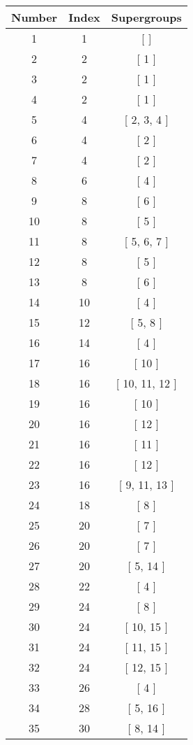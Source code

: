 \begin{center}
\begin{longtable}[H]{|| c c c ||}
\hline
Number & Index & Supergroups \\ 
\hline
1 & 1 & [ ] \\ 
\hline
2 & 2 & [ 1 ] \\ 
\hline
3 & 2 & [ 1 ] \\ 
\hline
4 & 2 & [ 1 ] \\ 
\hline
5 & 4 & [ 2, 3, 4 ] \\ 
\hline
6 & 4 & [ 2 ] \\ 
\hline
7 & 4 & [ 2 ] \\ 
\hline
8 & 6 & [ 4 ] \\ 
\hline
9 & 8 & [ 6 ] \\ 
\hline
10 & 8 & [ 5 ] \\ 
\hline
11 & 8 & [ 5, 6, 7 ] \\ 
\hline
12 & 8 & [ 5 ] \\ 
\hline
13 & 8 & [ 6 ] \\ 
\hline
14 & 10 & [ 4 ] \\ 
\hline
15 & 12 & [ 5, 8 ] \\ 
\hline
16 & 14 & [ 4 ] \\ 
\hline
17 & 16 & [ 10 ] \\ 
\hline
18 & 16 & [ 10, 11, 12 ] \\ 
\hline
19 & 16 & [ 10 ] \\ 
\hline
20 & 16 & [ 12 ] \\ 
\hline
21 & 16 & [ 11 ] \\ 
\hline
22 & 16 & [ 12 ] \\ 
\hline
23 & 16 & [ 9, 11, 13 ] \\ 
\hline
24 & 18 & [ 8 ] \\ 
\hline
25 & 20 & [ 7 ] \\ 
\hline
26 & 20 & [ 7 ] \\ 
\hline
27 & 20 & [ 5, 14 ] \\ 
\hline
28 & 22 & [ 4 ] \\ 
\hline
29 & 24 & [ 8 ] \\ 
\hline
30 & 24 & [ 10, 15 ] \\ 
\hline
31 & 24 & [ 11, 15 ] \\ 
\hline
32 & 24 & [ 12, 15 ] \\ 
\hline
33 & 26 & [ 4 ] \\ 
\hline
34 & 28 & [ 5, 16 ] \\ 
\hline
35 & 30 & [ 8, 14 ] \\ 
\hline

\end{longtable}
\end{center}
